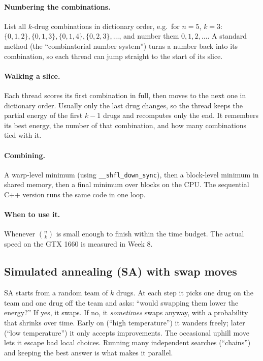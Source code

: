 \paragraph{Numbering the combinations.} List all $k$-drug combinations in dictionary order, e.g.\ for $n=5$, $k=3$: $\{0,1,2\},\{0,1,3\},\{0,1,4\},\{0,2,3\},\dots$, and number them $0,1,2,\dots$. A standard method (the ``combinatorial number system'') turns a number back into its combination, so each thread can jump straight to the start of its slice.

\paragraph{Walking a slice.} Each thread scores its first combination in full, then moves to the next one in dictionary order. Usually only the last drug changes, so the thread keeps the partial energy of the first $k-1$ drugs and recomputes only the end. It remembers its best energy, the number of that combination, and how many combinations tied with it.

\paragraph{Combining.} A warp-level minimum (using \texttt{\_\_shfl\_down\_sync}), then a block-level minimum in shared memory, then a final minimum over blocks on the CPU. The sequential C++ version runs the same code in one loop.

\paragraph{When to use it.} Whenever $\binom{n}{k}$ is small enough to finish within the time budget. The actual speed on the GTX 1660 is measured in Week 8.

\subsection{Simulated annealing (SA) with swap moves}

\begin{plainwords}
SA starts from a random team of $k$ drugs. At each step it picks one drug on the team and one drug off the team and asks: ``would swapping them lower the energy?'' If yes, it swaps. If no, it \emph{sometimes} swaps anyway, with a probability that shrinks over time. Early on (``high temperature'') it wanders freely; later (``low temperature'') it only accepts improvements. The occasional uphill move lets it escape bad local choices. Running many independent searches (``chains'') and keeping the best answer is what makes it parallel.
\end{plainwords}

